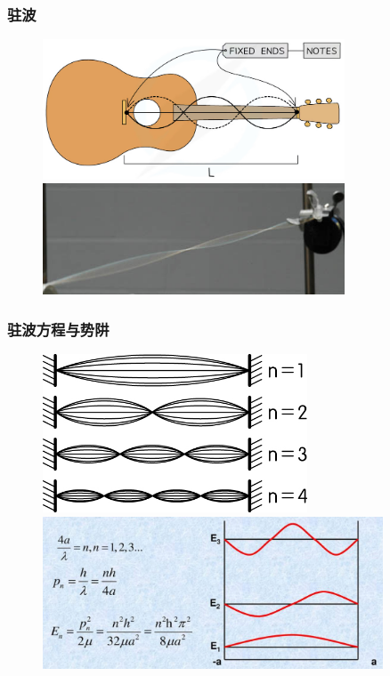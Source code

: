 \frame
{
	\frametitle{\textrm{驻波}}
\begin{figure}[h!]
\centering
\vspace{-15.5pt}
\includegraphics[height=0.40\textwidth,width=0.8\textwidth,viewport=0 0 900 450,clip]{Figures/Guitar-string.png}
\vskip 0.1pt
\includegraphics[height=0.35\textwidth,width=0.8\textwidth,viewport=0 0 122 48,clip]{Figures/string-standing-wave.jpg}
\label{Standing_Wave_0}
\end{figure}
}

\frame
{
	\frametitle{驻波方程与势阱}
\begin{figure}[h!]
\centering
\vspace{-12.5pt}
\includegraphics[height=0.32\textwidth,width=0.7\textwidth,viewport=0 0 125 75,clip]{Figures/Standing_wave.jpeg}
\vskip 2pt
\includegraphics[height=0.40\textwidth,width=0.9\textwidth,viewport=0 0 1200 550,clip]{Figures/Standing_wave-energy.jpg}
\label{Standing_Wave_1}
\end{figure}
}


